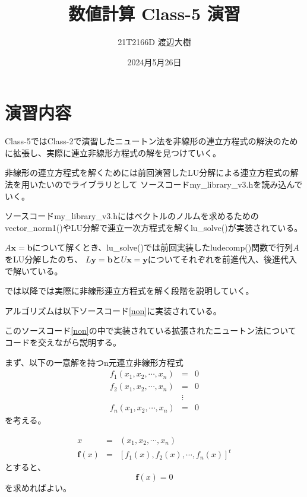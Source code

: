 \documentclass[a4paper,11pt]{jsarticle}
\begin{document}

\title{数値計算 Class-5 演習}
\author{21T2166D 渡辺大樹}
\date{2024月5月26日}
\maketitle

\section{演習内容}
Class-5ではClass-2で演習したニュートン法を非線形の連立方程式の解決のために拡張し、実際に連立非線形方程式の解を見つけていく。

非線形の連立方程式を解くためには前回演習したLU分解による連立方程式の解法を用いたいのでライブラリとして
ソースコードmy\_library\_v3.hを読み込んでいく。

ソースコードmy\_library\_v3.hにはベクトルのノルムを求めるためのvector\_norm1()やLU分解で連立一次方程式を解くlu\_solve()が実装されている。

$A\textbf{x}=\textbf{b}$について解くとき、lu\_solve()では前回実装したludecomp()関数で行列$A$をLU分解したのち、
$L\textbf{y}=\textbf{b}$と$U\textbf{x}=\textbf{y}$についてそれぞれを前進代入、後進代入で解いている。

では以降では実際に非線形連立方程式を解く段階を説明していく。

アルゴリズムは以下ソースコード\ref{non}に実装されている。


\newpage
このソースコード\ref{non}の中で実装されている拡張されたニュートン法についてコードを交えながら説明する。

まず、以下の一意解を持つn元連立非線形方程式
\begin{displaymath}
    \begin{array}{lll}
        f_1(x_1,x_2,\cdots,x_n) & =      & 0 \\
        f_2(x_1,x_2,\cdots,x_n) & =      & 0 \\
                                & \vdots &   \\
        f_n(x_1,x_2,\cdots,x_n) & =      & 0
    \end{array}
\end{displaymath}
を考える。

\begin{displaymath}
    \begin{array}{lll}
        x             & = & (x_1,x_2,\cdots,x_n)               \\
        \textbf{f}(x) & = & [f_1(x), f_2(x), \cdots, f_n(x)]^t
    \end{array}
\end{displaymath}
とすると、
\begin{displaymath}
    \textbf{f}(x) = 0
\end{displaymath}
を求めればよい。
\end{document}
